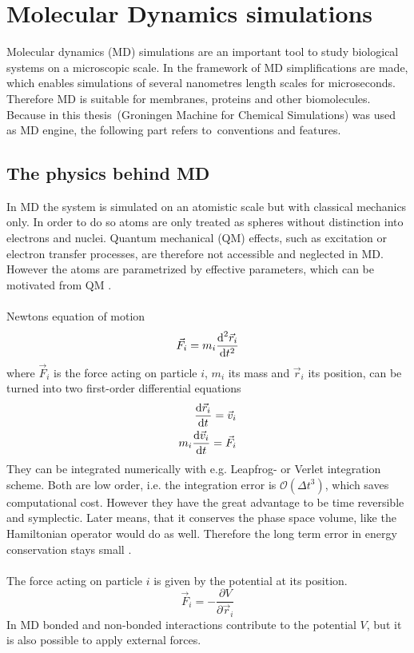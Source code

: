\section{Molecular Dynamics simulations}
Molecular dynamics (MD) simulations are an important tool to study biological systems on a microscopic scale. In the framework of MD simplifications are made, which enables simulations of several nanometres length scales for microseconds. Therefore MD is suitable for membranes, proteins and other biomolecules.\\
Because in this thesis \gromacs\,(Groningen Machine for Chemical Simulations) \autocites{gromacs1, gromacsManual} was used as MD engine, the following part refers to \gromacs\,conventions and features.
\subsection{The physics behind MD}
In MD the system is simulated on an atomistic scale but with classical mechanics only. In order to do so atoms are only treated as spheres without distinction into electrons and nuclei. Quantum mechanical (QM) effects, such as excitation or electron transfer processes, are therefore not accessible and neglected in MD. However the atoms are parametrized by effective parameters, which can be motivated from QM \autocite[p. 127f]{greenBook}.\\
\\
Newtons equation of motion
\begin{equation}
\vec{F}_i = m_i\frac{\text{d}^2 \vec{r}_i}{\text{d} t^2}
\end{equation}
where $\vec{F}_i$ is the force acting on particle $i$, $m_i$ its mass and $\vec{r}_i$ its position, can be turned into two first-order differential equations
\begin{align}
\label{eq:eq_of_mot_first_order}
\frac{\text{d} \vec{r}_i}{\text{d} t} = \vec{v}_i \\
m_i \frac{\text{d} \vec{v}_i}{\text{d} t} = \vec{F}_i
\end{align}
They can be integrated numerically with e.g. Leapfrog- or Verlet integration scheme. Both are low order, i.e. the integration error is $\mathcal{O}(\Delta t^3)$, which saves computational cost. However they have the great advantage to be time reversible and symplectic. Later means, that it conserves the phase space volume, like the Hamiltonian operator would do as well. Therefore the long term error in energy conservation stays small \autocite[p. 72ff]{UnderstandingMD}.\\
\\
The force acting on particle $i$ is given by the potential at its position.
\begin{equation}
\vec{F}_i = - \frac{\partial V}{\partial \vec{r}_i}
\end{equation}
In MD bonded and non-bonded interactions contribute to the potential $V$, but it is also possible to apply external forces.

